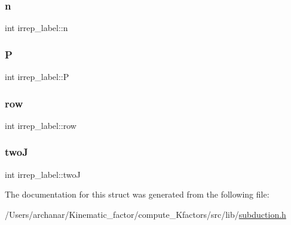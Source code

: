 \mbox{\label{structirrep__label_a6f7203722a797aa0fb81e1e4a7370ad8}} 
\subsubsection{\texorpdfstring{n}{n}}
{\footnotesize\ttfamily int irrep\+\_\+label\+::n}

\mbox{\label{structirrep__label_a87f13a9fa6fc452cd31cfbc8cbc5197d}} 
\subsubsection{\texorpdfstring{P}{P}}
{\footnotesize\ttfamily int irrep\+\_\+label\+::P}

\mbox{\label{structirrep__label_a3e47b0519d5ae65e48b1e3fe509bcc13}} 
\subsubsection{\texorpdfstring{row}{row}}
{\footnotesize\ttfamily int irrep\+\_\+label\+::row}

\mbox{\label{structirrep__label_a2815db2b707875ae496bdbfd52d3c240}} 
\subsubsection{\texorpdfstring{twoJ}{twoJ}}
{\footnotesize\ttfamily int irrep\+\_\+label\+::twoJ}



The documentation for this struct was generated from the following file\+:\begin{DoxyCompactItemize}
\item 
/\+Users/archanar/\+Kinematic\+\_\+factor/compute\+\_\+\+Kfactors/src/lib/\mbox{\hyperlink{src_2lib_2subduction_8h}{subduction.\+h}}\end{DoxyCompactItemize}
